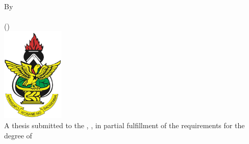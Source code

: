 
\begin{titlepage}
\thispagestyle{empty} %
\begin{center}

{\LARGE \textbf{\MakeUppercase{\thesistitle}}}\\[1.5cm]

{\large By\\[0.5cm]
\thesisauthor\\[0.3cm]
(\thesispreviousdegrees)}\\[2cm]


\includegraphics[width=3cm]{images/knust-logo.png}\\[1.5cm]


{\large A thesis submitted to the \thesisdepartment, \thesisuniversity, in partial fulfillment of the requirements for the degree of\\[2.5cm]
\MakeUppercase{\thesisdegree}}\\[2.5cm]


{\large \thesisdate}

\end{center}
\end{titlepage}

\setcounter{page}{2}

